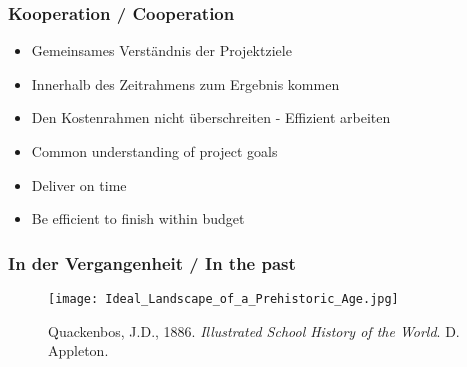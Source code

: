 \documentclass[13pt]{beamer}
\begin{document}
\begin{frame}
  \frametitle{Kooperation / \textcolor{mfn_green}{Cooperation}}

  \begin{itemize}
  \item{Gemeinsames Verständnis der Projektziele}
  \item{Innerhalb des Zeitrahmens zum Ergebnis kommen}
  \item{Den Kostenrahmen nicht überschreiten - Effizient arbeiten}
  \end{itemize}
  
  \begin{itemize}
  \item{\textcolor{mfn_green}{Common understanding of project goals}}
  \item{\textcolor{mfn_green}{Deliver on time}}
  \item{\textcolor{mfn_green}{Be efficient to finish within budget}}
  \end{itemize}
\end{frame}

%
%

\begin{frame}
  \frametitle{In der Vergangenheit / \textcolor{mfn_green}{In the past}}
  \begin{figure}
    \texttt{[image: Ideal\_Landscape\_of\_a\_Prehistoric\_Age.jpg]}
    \caption{Quackenbos, J.D., 1886. \textit{Illustrated School History of the World}. D. Appleton.}
  \end{figure}
\end{frame}
\end{document}

